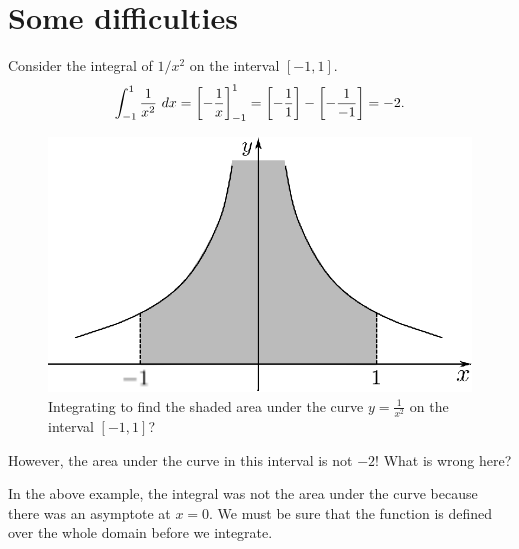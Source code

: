 \section{Some difficulties}
\begin{example}
Consider the integral of $1/x^2$ on the interval $[-1,1]$.
\[\int_{-1}^1\frac{1}{x^2}\ dx=\left[-\frac{1}{x}\right]_{-1}^1=\left[-\frac{1}{1}\right]-\left[-\frac{1}{-1}\right]=-2.\]

\begin{figure}[H]
\centering
\includegraphics[scale=0.8]{img/integration-graph-over-x-squared-0}
\caption{Integrating to find the shaded area under the curve $y=\frac{1}{x^2}$ on the interval $[-1,1]$?}
\label{fig:integration-graph-over-x-squared=0}
\end{figure}

However, the area under the curve in this interval is not $-2$! What is wrong here?
\end{example}

In the above example, the integral was not the area under the curve because there was an asymptote at $x=0$. We must be sure that the function is defined
over the whole domain before we integrate.

